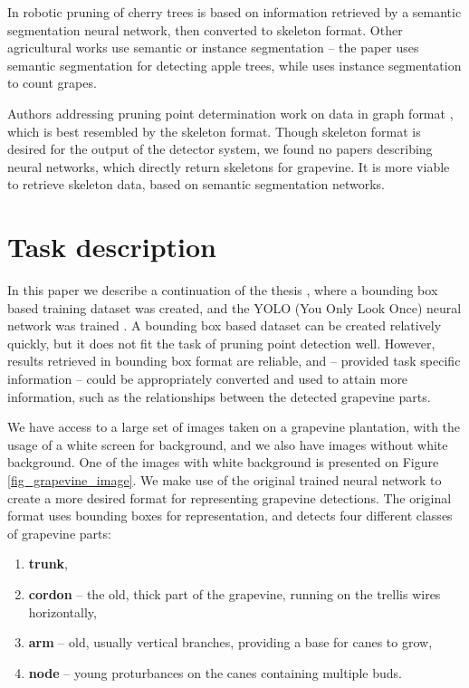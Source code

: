 \documentclass{PSAIE}%
\begin{document}
In \cite{you2021semantics} robotic pruning of cherry trees is based on information retrieved by a
semantic segmentation neural network, then converted to skeleton format. Other
agricultural works use semantic or instance segmentation -- the paper \cite{chen2021semantic} uses semantic
segmentation for detecting apple trees, while \cite{santos2020grape} uses instance segmentation to count
grapes.

Authors addressing pruning point determination work on data in graph format \cite{goesmannai}, which is best
resembled by the skeleton format. Though skeleton format is desired for the output of the detector system,
we found no papers describing neural networks, which directly return skeletons for grapevine.
It is more viable to retrieve skeleton data, based on \cite{you2021semantics} semantic segmentation networks.

\section{Task description} \label{sec_task_description}
In this paper we describe a continuation of the thesis \cite{bolyki_2021}, where a bounding box based training
dataset was created, and the YOLO (You Only Look Once) neural network was trained
\cite{glenn_jocher_2021_5563715}.
A bounding box based dataset can be created relatively quickly, but it does not fit the task of pruning
point detection well. However, results retrieved in bounding box format are reliable, and -- provided task
specific information -- could be appropriately converted and used to attain more information, such as
the relationships between the detected grapevine parts.

We have access to a large set of images taken on a grapevine plantation, with the usage of a white screen
for background, and we also have images without white background. One of the images with white background is
presented on Figure \ref{fig_grapevine_image}.
We make use of the original \cite{bolyki_2021} trained neural network to create a more desired
format for representing grapevine detections. The original format uses bounding boxes for
representation, and detects four different classes of grapevine parts:
\begin{enumerate}
      \item \textbf{trunk},
      \item \textbf{cordon} -- the old, thick part of the grapevine, running on the trellis wires horizontally,
      \item \textbf{arm} -- old, usually vertical branches, providing a base for canes to grow,
      \item \textbf{node} -- young proturbances on the canes containing multiple buds.
\end{enumerate}
\end{document}
